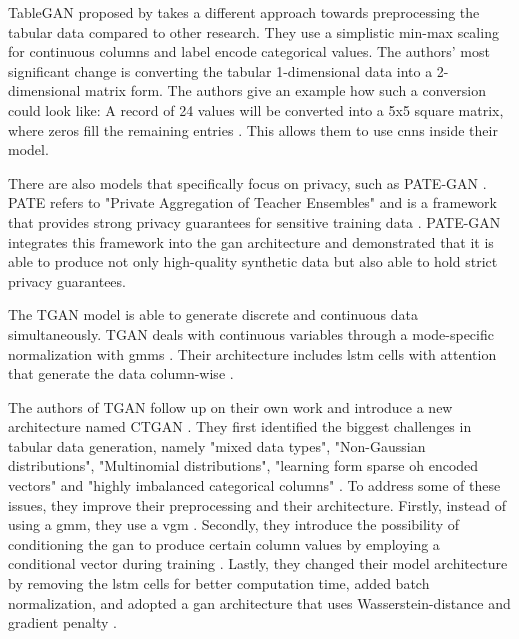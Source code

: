 TableGAN proposed by \cite{park2018DataSynthesisBased} takes a different approach towards preprocessing the tabular data compared to other research.
They use a simplistic min-max scaling for continuous columns and label encode categorical values.
The authors' most significant change is converting the tabular 1-dimensional data into a 2-dimensional matrix form.
The authors give an example how such a conversion could look like:
A record of 24 values will be converted into a 5x5 square matrix, where zeros fill the remaining entries \cite[p-4]{park2018DataSynthesisBased}.
This allows them to use \glspl{cnn} inside their model.

There are also models that specifically focus on privacy, such as PATE-GAN  \cite{jordon2018PATEGANGeneratingSynthetic}.
PATE refers to "Private Aggregation of Teacher Ensembles" \cite{papernot2017SemisupervisedKnowledgeTransfer} and is a framework that provides strong privacy guarantees for sensitive training data \cite{jordon2018PATEGANGeneratingSynthetic}.
PATE-GAN integrates this framework into the \gls{gan} architecture and demonstrated that it is able to produce not only high-quality synthetic data but also able to hold strict privacy guarantees.

The TGAN \cite{xu2018SynthesizingTabularData} model is able to generate discrete and continuous data simultaneously.
TGAN deals with continuous variables through a mode-specific normalization with \glspl{gmm} \cite[p. 3]{xu2018SynthesizingTabularData}.
Their architecture includes \gls{lstm} cells with attention that generate the data column-wise \cite{xu2018SynthesizingTabularData}.

The authors of TGAN follow up on their own work and introduce a new architecture named CTGAN \cite{xu2019ModelingTabularData}.
They first identified the biggest challenges in tabular data generation, namely "mixed data types", "Non-Gaussian distributions", "Multinomial distributions", "learning form sparse \gls{oh} encoded vectors" and "highly imbalanced categorical columns" \cite[p. 3]{xu2019ModelingTabularData}.
To address some of these issues, they improve their preprocessing and their architecture.
Firstly, instead of using a \gls{gmm}, they use a \gls{vgm} \cite{xu2019ModelingTabularData}.
Secondly, they introduce the possibility of conditioning the \gls{gan} to produce certain column values by employing a conditional vector during training \cite{xu2019ModelingTabularData}.
Lastly, they changed their model architecture by removing the \gls{lstm} cells for better computation time, added batch normalization, 
and adopted a \gls{gan} architecture that uses Wasserstein-distance and gradient penalty \cite{gulrajani2017ImprovedTrainingWasserstein}.

